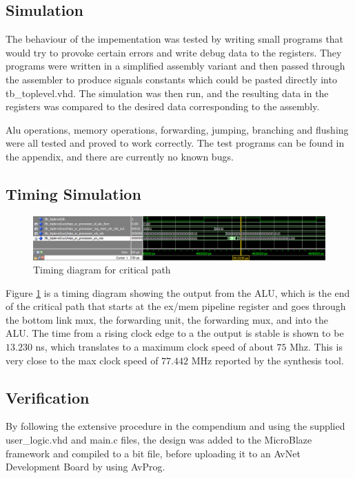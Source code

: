 \subsection{Simulation}

The behaviour of the impementation was tested by writing small programs that would try to provoke certain errors and write debug data to the registers.
They programs were written in a simplified assembly variant and then passed through the assembler to produce signals constants which could be pasted directly into tb\_toplevel.vhd.
The simulation was then run, and the resulting data in the registers was compared to the desired data corresponding to the assembly.

Alu operations, memory operations, forwarding, jumping, branching and flushing were all tested and proved to work correctly. The test programs can be found in the appendix, and there are currently no known bugs.

\subsection{Timing Simulation}

\begin{figure}[ht]
    \centering
    \includegraphics[scale=0.5]{figures/TimingSimulation.png}
    \caption{Timing diagram for critical path} 
    \label{fig:timing}
\end{figure}

Figure \ref{fig:timing} is a timing diagram showing the output from the ALU, which is the end of the critical path that starts at the ex/mem pipeline register and goes through the bottom link mux, the forwarding unit, the forwarding mux, and into the ALU.
The time from a rising clock edge to a the output is stable is shown to be $13.230$ ns, which translates to a maximum clock speed of about $75$ Mhz.
This is very close to the max clock speed of $77.442$ MHz reported by the synthesis tool.

\subsection{Verification}

By following the extensive procedure in the compendium \cite[p.47]{lab-compendium} and using the supplied user\_logic.vhd and main.c files, the design was added to the MicroBlaze framework and compiled to a bit file, before uploading it to an AvNet Development Board by using AvProg.


